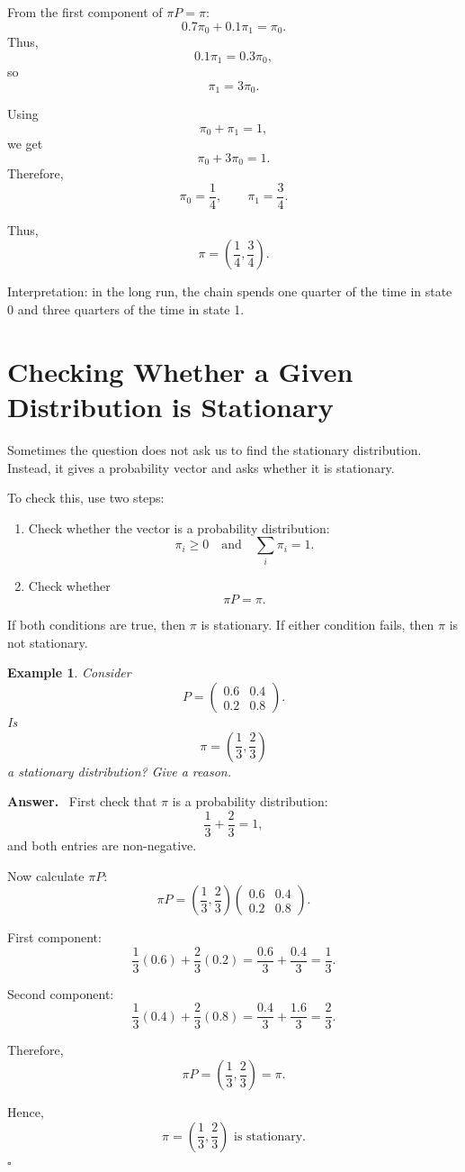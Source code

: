 \documentclass[12pt,a4paper]{article}
\theoremstyle{notestyle}
\newtheorem{example}{Example}
\newenvironment{answer}
{\par\textbf{Answer.}\ }
{\hfill$\square$\par}
\begin{document}
From the first component of $\pi P=\pi$:
\[
0.7\pi_0+0.1\pi_1=\pi_0.
\]
Thus,
\[
0.1\pi_1=0.3\pi_0,
\]
so
\[
\pi_1=3\pi_0.
\]

Using
\[
\pi_0+\pi_1=1,
\]
we get
\[
\pi_0+3\pi_0=1.
\]
Therefore,
\[
\pi_0=\frac14,
\qquad
\pi_1=\frac34.
\]

Thus,
\[
\boxed{\pi=\left(\frac14,\frac34\right).}
\]

Interpretation: in the long run, the chain spends one quarter of the time in state 0 and three quarters of the time in state 1.

\section{Checking Whether a Given Distribution is Stationary}

Sometimes the question does not ask us to find the stationary distribution. Instead, it gives a probability vector and asks whether it is stationary.

To check this, use two steps:
\begin{enumerate}[leftmargin=1.2cm]
    \item Check whether the vector is a probability distribution:
    \[
    \pi_i\geq 0
    \quad\text{and}\quad
    \sum_i\pi_i=1.
    \]
    \item Check whether
    \[
    \pi P=\pi.
    \]
\end{enumerate}

If both conditions are true, then $\pi$ is stationary. If either condition fails, then $\pi$ is not stationary.

\begin{example}
Consider
\[
P=
\begin{pmatrix}
0.6 & 0.4\\
0.2 & 0.8
\end{pmatrix}.
\]
Is
\[
\pi=\left(\frac13,\frac23\right)
\]
a stationary distribution? Give a reason.
\end{example}

\begin{answer}
First check that $\pi$ is a probability distribution:
\[
\frac13+\frac23=1,
\]
and both entries are non-negative.

Now calculate $\pi P$:
\[
\pi P
=
\left(\frac13,\frac23\right)
\begin{pmatrix}
0.6 & 0.4\\
0.2 & 0.8
\end{pmatrix}.
\]

First component:
\[
\frac13(0.6)+\frac23(0.2)
=
\frac{0.6}{3}+\frac{0.4}{3}
=
\frac{1}{3}.
\]

Second component:
\[
\frac13(0.4)+\frac23(0.8)
=
\frac{0.4}{3}+\frac{1.6}{3}
=
\frac{2}{3}.
\]

Therefore,
\[
\pi P=\left(\frac13,\frac23\right)=\pi.
\]

Hence,
\[
\boxed{\pi=\left(\frac13,\frac23\right)\text{ is stationary.}}
\]
\end{answer}
\end{document}
